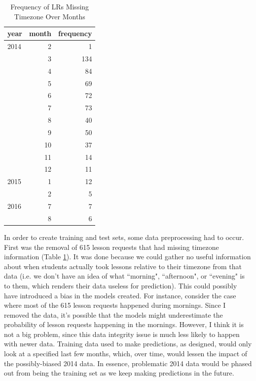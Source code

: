 \documentclass[oneside]{article}
\begin{document}
\begin{table}[]
  \centering
  \caption{Frequency of LRs Missing Timezone Over Months}
  \label{tab:freq_lrs_missing_timezone_over_months}
  \begin{tabular}{lrr}
    \hline
    \textbf{year} & \textbf{month} & \textbf{frequency} \\
    \hline
      2014 &  2  &    1\\
           &  3  &  134\\
           &  4  &   84\\
           &  5  &   69\\
           &  6  &   72\\
           &  7  &   73\\
           &  8  &   40\\
           &  9  &   50\\
           &  10 &   37\\
           &  11 &   14\\
           &  12 &   11\\
      2015 &  1  &   12\\
           &  2  &    5\\
      2016 &  7  &    7\\
           &  8  &    6\\
    \hline
  \end{tabular}
\end{table}



In order to create training and test sets, some data preprocessing had to
occur. First was the removal of 615 lesson requests that had missing timezone
information (Table \ref{tab:freq_lrs_missing_timezone_over_months}). It was
done because we could gather no useful information about when students actually
took lessons relative to their timezone from that data (i.e. we don't have an
idea of what ``morning", ``afternoon", or ``evening" is to them, which renders
their data useless for prediction). This could possibly have introduced a bias
in the models created. For instance, consider the case where most of the 615
lesson requests happened during mornings. Since I removed the data, it's
possible that the models might underestimate the probability of lesson requests
happening in the mornings. However, I think it is not a big problem, since this
data integrity issue is much less likely to happen with newer data. Training
data used to make predictions, as designed, would only look at a specified last
few months, which, over time, would lessen the impact of the possibly-biased
2014 data. In essence, problematic 2014 data would be phased out from being the
training set as we keep making predictions in the future.
\end{document}
